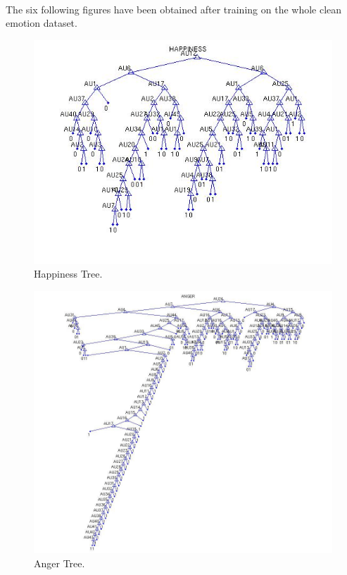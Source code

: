 \documentclass[a4paper,12pt,oneside,final]{report}
\newenvironment{changemargin}[2]{\begin{list}{}{%
\setlength{\topsep}{0pt}%
\setlength{\leftmargin}{0pt}%
\setlength{\rightmargin}{0pt}%
\setlength{\listparindent}{\parindent}%
\setlength{\itemindent}{\parindent}%
\setlength{\parsep}{0pt plus 1pt}%
\addtolength{\leftmargin}{#1}%
\addtolength{\rightmargin}{#2}%
}\item }{\end{list}}
\begin{document}
\paragraph{}
The six following figures have been obtained after training on the whole clean emotion dataset.
\label{ch:trees}
\begin{figure}[!h]
\center
\includegraphics[scale=0.6]{happiness.jpg}
\caption{Happiness Tree.}
\end{figure}

\begin{figure}[h]
\begin{changemargin}{-20mm}{-20mm}
\begin{center}
\includegraphics[scale=0.6]{anger.jpg}
\end{center}
\caption{Anger Tree.}
\end{changemargin}
\end{figure}
\end{document}
